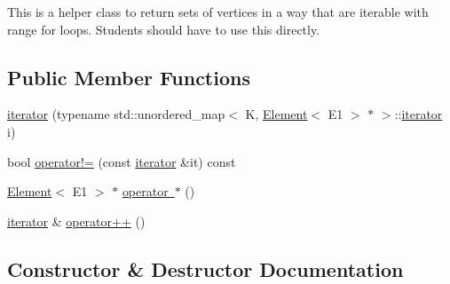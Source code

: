 This is a helper class to return sets of vertices in a way that are iterable with range for loops. Students should have to use this directly. \subsection*{Public Member Functions}
\begin{DoxyCompactItemize}
\item 
\mbox{\hyperlink{classbridges_1_1datastructure_1_1_graph_adj_list_1_1_vertex_element_set__listhelper_1_1iterator_abbd97f84b3192386e6a0cf3c523d1d1a}{iterator}} (typename std\+::unordered\+\_\+map$<$ K, \mbox{\hyperlink{classbridges_1_1datastructure_1_1_element}{Element}}$<$ E1 $>$ $\ast$ $>$\+::\mbox{\hyperlink{classbridges_1_1datastructure_1_1_graph_adj_list_1_1_vertex_element_set__listhelper_1_1iterator}{iterator}} i)
\item 
bool \mbox{\hyperlink{classbridges_1_1datastructure_1_1_graph_adj_list_1_1_vertex_element_set__listhelper_1_1iterator_a1df44cf11b2aeec0c37379f6ccc9ebc0}{operator!=}} (const \mbox{\hyperlink{classbridges_1_1datastructure_1_1_graph_adj_list_1_1_vertex_element_set__listhelper_1_1iterator}{iterator}} \&it) const
\item 
\mbox{\hyperlink{classbridges_1_1datastructure_1_1_element}{Element}}$<$ E1 $>$ $\ast$ \mbox{\hyperlink{classbridges_1_1datastructure_1_1_graph_adj_list_1_1_vertex_element_set__listhelper_1_1iterator_a7eba15c3cd40ebc081cfc3b69a4e5907}{operator $\ast$}} ()
\item 
\mbox{\hyperlink{classbridges_1_1datastructure_1_1_graph_adj_list_1_1_vertex_element_set__listhelper_1_1iterator}{iterator}} \& \mbox{\hyperlink{classbridges_1_1datastructure_1_1_graph_adj_list_1_1_vertex_element_set__listhelper_1_1iterator_aa66d21cb8b5cd0f8fdfc9bcab19cae84}{operator++}} ()
\end{DoxyCompactItemize}


\subsection{Constructor \& Destructor Documentation}
\mbox{\label{classbridges_1_1datastructure_1_1_graph_adj_list_1_1_vertex_element_set__listhelper_1_1iterator_abbd97f84b3192386e6a0cf3c523d1d1a}} 
